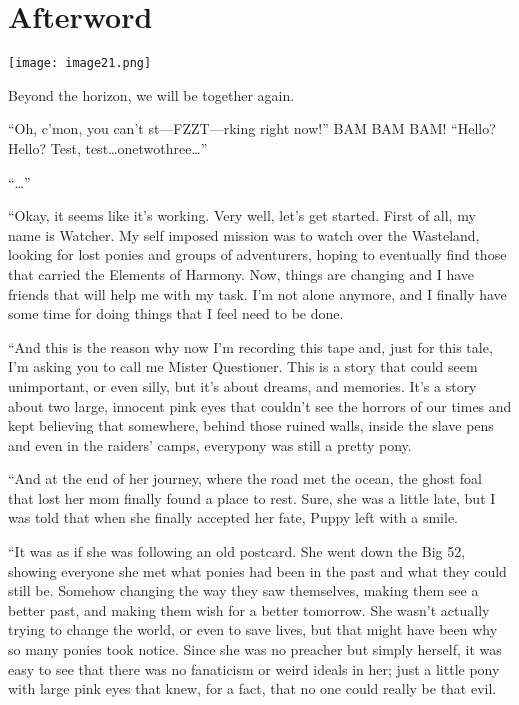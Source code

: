 \chapter{Afterword}

\texttt{[image: image21.png]}

\begin{intro}
Beyond the horizon, we will be together again.
\end{intro}

{\rt

``Oh, c'mon, you can't st---FZZT---rking right now!'' BAM BAM BAM! ``Hello? Hello? Test, test\dots onetwothree\dots''

``\dots''

``Okay, it seems like it's working. Very well, let's get started. First of all, my name is Watcher. My self imposed mission was to watch over the Wasteland, looking for lost ponies and groups of adventurers, hoping to eventually find those that carried the Elements of Harmony. Now, things are changing and I have friends that will help me with my task. I'm not alone anymore, and I finally have some time for doing things that I feel need to be done.

``And this is the reason why now I'm recording this tape and, just for this tale, I'm asking you to call me Mister Questioner. This is a story that could seem unimportant, or even silly, but it's about dreams, and memories. It's a story about two large, innocent pink eyes that couldn't see the horrors of our times and kept believing that somewhere, behind those ruined walls, inside the slave pens and even in the raiders' camps, everypony was still a pretty pony.

``And at the end of her journey, where the road met the ocean, the ghost foal that lost her mom finally found a place to rest. Sure, she was a little late, but I was told that when she finally accepted her fate, Puppy left with a smile.

``It was as if she was following an old postcard. She went down the Big 52, showing everyone she met what ponies had been in the past and what they could still be. Somehow changing the way they saw themselves, making them see a better past, and making them wish for a better tomorrow. She wasn't actually trying to change the world, or even to save lives, but that might have been why so many ponies took notice. Since she was no preacher but simply herself, it was easy to see that there was no fanaticism or weird ideals in her; just a little pony with large pink eyes that knew, for a fact, that no one could really be that evil.

}
